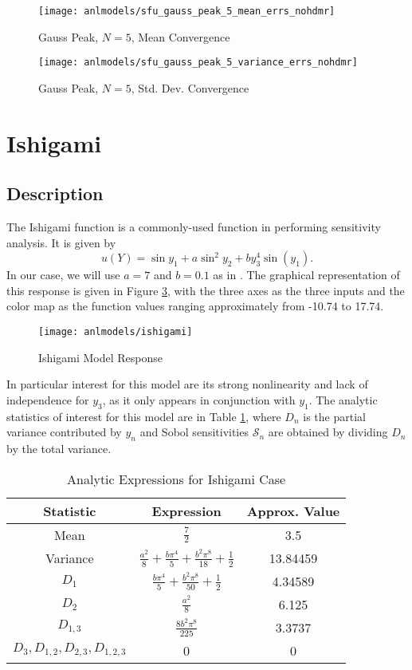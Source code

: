 \begin{figure}[H]
  \centering
  \texttt{[image: anlmodels/sfu\_gauss\_peak\_5\_mean\_errs\_nohdmr]}
  \caption{Gauss Peak, $N=5$, Mean Convergence}
  \label{fig:gauss peak mean errors 5}
\end{figure}
\begin{figure}[H]
  \centering
  \texttt{[image: anlmodels/sfu\_gauss\_peak\_5\_variance\_errs\_nohdmr]}
  \caption{Gauss Peak, $N=5$, Std. Dev. Convergence}
  \label{fig:gauss peak var errors 5}
\end{figure}




\section{Ishigami}
\subsection{Description}\label{mod:ishigami}
The Ishigami function \cite{ishigami} is a commonly-used function in performing sensitivity analysis.  It is
given by
\begin{equation}
  u(Y) = \sin{y_1} + a\sin^2{y_2} + b y_3^4\sin(y_1).
\end{equation}
In our case, we will use $a=7$ and $b=0.1$ as in \cite{ishigami2}.
The graphical representation of this response is given in Figure \ref{fig: ishigami}, with the three axes
as the three inputs and the color map as the function values ranging approximately from -10.74 to 17.74.
\begin{figure}[htb]
  \centering
  \texttt{[image: anlmodels/ishigami]}
  \caption{Ishigami Model Response}
  \label{fig: ishigami}
\end{figure}
In particular interest for this model are
its strong nonlinearity and lack of independence for $y_3$, as it only appears in conjunction with $y_1$.  The
analytic statistics of interest for this model are in Table \ref{tab:ishigami moments}, where $D_n$ is the
partial variance contributed by $y_n$ and Sobol sensitivities $\mathcal{S}_n$ are obtained by dividing $D_n$
by the total variance.

\begin{table}[H]
  \centering
  \begin{tabular}{c|c|c}
  Statistic & Expression & Approx. Value \\\hline
  Mean & $\frac{7}{2}$ & 3.5 \\
  Variance & $\frac{a^2}{8} + \frac{b\pi^4}{5} + \frac{b^2\pi^8}{18} + \frac{1}{2}$ & 13.84459 \\
  $D_1$ & $\frac{b\pi^4}{5} + \frac{b^2\pi^8}{50} + \frac{1}{2} $ &  4.34589 \\
  $D_2$ & $\frac{a^2}{8}$ & 6.125 \\
  $D_{1,3}$ & $\frac{8b^2\pi^8}{225}$ & 3.3737 \\
  $D_3,D_{1,2},D_{2,3},D_{1,2,3}$ & 0 & 0
  \end{tabular}
  \caption{Analytic Expressions for Ishigami Case}
  \label{tab:ishigami moments}
\end{table}


